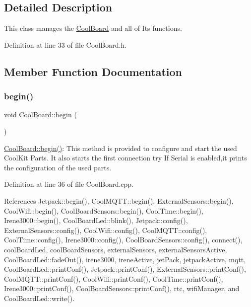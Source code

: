 \subsection{Detailed Description}
This class manages the \hyperlink{classCoolBoard}{Cool\+Board} and all of Its functions. 

Definition at line 33 of file Cool\+Board.\+h.



\subsection{Member Function Documentation}
\mbox{\label{classCoolBoard_acba7c5aef7268b2c0044bdb54d3b9d76}} 
\subsubsection{\texorpdfstring{begin()}{begin()}}
{\footnotesize\ttfamily void Cool\+Board\+::begin (\begin{DoxyParamCaption}{ }\end{DoxyParamCaption})}

\hyperlink{classCoolBoard_acba7c5aef7268b2c0044bdb54d3b9d76}{Cool\+Board\+::begin()}\+: This method is provided to configure and start the used Cool\+Kit Parts. It also starts the first connection try If Serial is enabled,it prints the configuration of the used parts. 

Definition at line 36 of file Cool\+Board.\+cpp.



References Jetpack\+::begin(), Cool\+M\+Q\+T\+T\+::begin(), External\+Sensors\+::begin(), Cool\+Wifi\+::begin(), Cool\+Board\+Sensors\+::begin(), Cool\+Time\+::begin(), Irene3000\+::begin(), Cool\+Board\+Led\+::blink(), Jetpack\+::config(), External\+Sensors\+::config(), Cool\+Wifi\+::config(), Cool\+M\+Q\+T\+T\+::config(), Cool\+Time\+::config(), Irene3000\+::config(), Cool\+Board\+Sensors\+::config(), connect(), cool\+Board\+Led, cool\+Board\+Sensors, external\+Sensors, external\+Sensors\+Active, Cool\+Board\+Led\+::fade\+Out(), irene3000, irene\+Active, jet\+Pack, jetpack\+Active, mqtt, Cool\+Board\+Led\+::print\+Conf(), Jetpack\+::print\+Conf(), External\+Sensors\+::print\+Conf(), Cool\+M\+Q\+T\+T\+::print\+Conf(), Cool\+Wifi\+::print\+Conf(), Cool\+Time\+::print\+Conf(), Irene3000\+::print\+Conf(), Cool\+Board\+Sensors\+::print\+Conf(), rtc, wifi\+Manager, and Cool\+Board\+Led\+::write().


